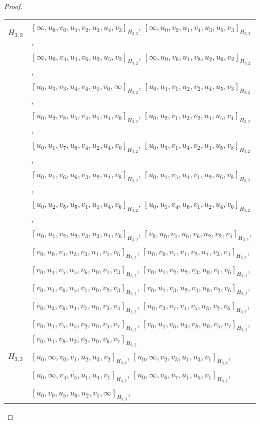 \begin{subappendices}
\begin{proof}
{ \small
\begin{longtable}{|c|l|}
\hline
$H_{3,2}$ &
  $[\infty, u_0, v_0, u_1, v_2, u_3, u_4, v_3]_{H_{3,2}}$,
  $[\infty, u_0, v_2, u_1, v_4, u_3, u_5, v_3]_{H_{3,2}}$, \\* &
  $[\infty, u_0, v_4, u_1, v_6, u_2, u_5, v_2]_{H_{3,2}}$,
  $[\infty, u_0, v_6, u_1, v_8, u_2, u_6, v_2]_{H_{3,2}}$, \\* &
  $[u_0, u_3, v_3, u_4, v_4, u_1, v_0, \infty]_{H_{3,2}}$,
  $[u_0, u_1, v_1, u_2, v_2, u_4, u_5, v_3]_{H_{3,2}}$, \\* &
  $[u_0, u_2, v_8, u_5, v_4, u_1, u_4, v_0]_{H_{3,2}}$,
  $[u_0, u_2, v_1, u_3, v_2, u_1, u_5, v_4]_{H_{3,2}}$, \\* &
  $[u_0, u_1, v_7, u_6, v_4, u_2, u_4, v_0]_{H_{3,2}}$,
  $[u_0, u_3, v_1, u_4, v_2, u_1, u_5, v_8]_{H_{3,2}}$, \\* &
  $[u_0, u_1, v_6, u_6, v_3, u_2, u_4, v_8]_{H_{3,2}}$,
  $[u_0, u_1, v_5, u_4, v_1, u_2, u_6, v_8]_{H_{3,2}}$, \\* &
  $[u_0, u_2, v_5, u_5, v_1, u_1, u_4, v_6]_{H_{3,2}}$,
  $[u_0, u_1, v_4, u_6, v_1, u_2, u_4, v_6]_{H_{3,2}}$, \\* &
  $[u_0, u_1, v_2, u_2, v_3, u_3, u_4, v_6]_{H_{3,2}}$,
  $[v_0, u_0, v_1, u_6, v_6, u_2, v_2, v_4]_{H_{3,2}}$, \\* &
  $[v_0, u_0, v_4, u_3, v_3, u_1, v_1, v_6]_{H_{3,2}}$,
  $[u_0, v_0, v_7, v_1, v_2, u_4, v_3, v_4]_{H_{3,2}}$, \\* &
  $[v_0, u_4, v_5, u_5, v_6, u_0, v_1, v_3]_{H_{3,2}}$,
  $[v_0, u_1, v_2, u_2, v_3, u_0, v_1, v_6]_{H_{3,2}}$, \\* &
  $[v_0, u_4, v_6, u_5, v_7, u_0, v_2, v_3]_{H_{3,2}}$,
  $[v_0, u_1, v_3, u_2, v_4, u_0, v_2, v_6]_{H_{3,2}}$, \\* &
  $[v_0, u_3, v_6, u_4, v_7, u_0, v_3, v_4]_{H_{3,2}}$,
  $[u_0, v_3, v_7, v_4, v_5, u_3, v_2, v_6]_{H_{3,2}}$, \\* &
  $[v_0, u_1, v_5, u_5, v_2, u_0, v_4, v_7]_{H_{3,2}}$,
  $[v_0, u_1, v_6, u_3, v_8, u_0, v_5, v_7]_{H_{3,2}}$, \\* &
  $[v_0, u_1, v_8, u_3, v_2, u_0, v_6, v_7]_{H_{3,2}}$
\\ \hline
$H_{3,3}$ &
  $[u_0, \infty, v_0, v_1, u_2, u_3, v_2]_{H_{3,3}}$,
  $[u_0, \infty, v_2, v_3, u_1, u_3, v_1]_{H_{3,3}}$, \\* &
  $[u_0, \infty, v_4, v_5, u_1, u_4, v_1]_{H_{3,3}}$,
  $[u_0, \infty, v_6, v_7, u_1, u_5, v_1]_{H_{3,3}}$, \\* &
  $[u_0, v_0, u_5, u_6, u_2, v_1, \infty]_{H_{3,3}}$,

\end{longtable}}
\end{proof}
\end{subappendices}
